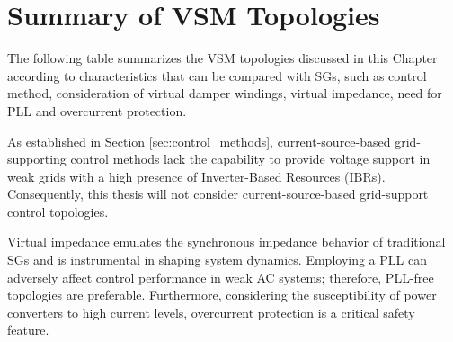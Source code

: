 \newpage
\section{Summary of VSM Topologies}

The following table summarizes the VSM topologies discussed in this Chapter
according to characteristics that can be compared with SGs, such as control
method, consideration of virtual damper windings, virtual impedance, need for
PLL and overcurrent protection. 

\begin{table}[ht!]
    \centering
    \caption{\centering Summary of VSM topologies.}
    \label{tab:topologies_summary}
\end{table}

As established in Section \ref{sec:control_methods}, current-source-based
grid-supporting control methods lack the capability to provide voltage support
in weak grids with a high presence of Inverter-Based Resources (IBRs).
Consequently, this thesis will not consider current-source-based grid-support
control topologies.

Virtual impedance emulates the synchronous impedance behavior of traditional SGs
and is instrumental in shaping system dynamics. Employing a PLL can adversely
affect control performance in weak AC systems; therefore, PLL-free topologies
are preferable. Furthermore, considering the susceptibility of power converters
to high current levels, overcurrent protection is a critical safety feature.

